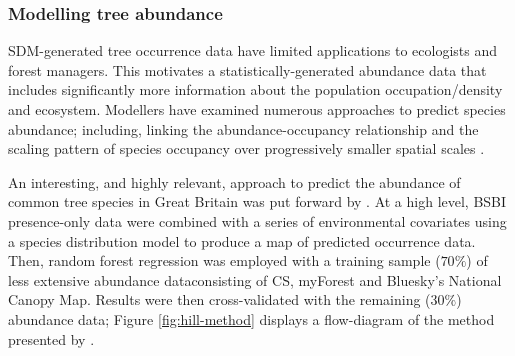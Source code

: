 \subsubsection{Modelling tree abundance}

SDM-generated tree occurrence data have limited applications to ecologists and forest managers.
This motivates a statistically-generated abundance data that includes significantly 
more information about the population occupation/density and ecosystem.
Modellers have examined numerous approaches to predict species abundance;
including, linking the abundance-occupancy relationship \cite{gaston2000abundance} and
the scaling pattern of species occupancy over progressively smaller spatial scales \cite{hui2009extrapolating}.

An interesting, and highly relevant, approach to predict the abundance of common tree species in Great Britain was put forward by \cite{hill.data}.
At a high level, BSBI presence-only data were combined with a series of environmental covariates using a species distribution model to 
produce a map of predicted occurrence data. Then, random forest regression was employed with a training sample ($70\%$) of less extensive abundance 
data\textemdash consisting of CS, myForest and Bluesky's National Canopy Map. 
Results were then cross-validated with the remaining ($30\%$) abundance data; Figure \ref{fig:hill-method} displays a
flow-diagram of the method presented by \cite{hill.data}. 

